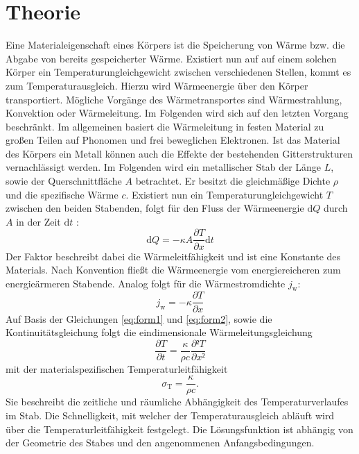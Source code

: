 
\section{Theorie}
\label{sec:Theorie}
Eine Materialeigenschaft eines Körpers ist die Speicherung von Wärme bzw. die Abgabe
 von bereits gespeicherter Wärme. Existiert nun auf auf einem solchen Körper
 ein Temperaturungleichgewicht zwischen verschiedenen Stellen, kommt es zum Temperaturausgleich.
 Hierzu wird Wärmeenergie über den Körper transportiert.
Mögliche Vorgänge des Wärmetransportes sind Wärmestrahlung, Konvektion oder
  Wärmeleitung. Im Folgenden wird sich auf den letzten Vorgang beschränkt. Im
  allgemeinen basiert die Wärmeleitung in festen Material zu großen Teilen auf Phonomen und
   frei beweglichen Elektronen. Ist das Material des Körpers ein Metall können auch die Effekte der
    bestehenden Gitterstrukturen vernachlässigt werden. Im Folgenden wird ein metallischer Stab der
    Länge $L$, sowie der Querschnittfläche $A$ betrachtet. Er besitzt die
    gleichmäßige Dichte $\rho$ und die spezifische Wärme $c$. Existiert nun ein
    Temperaturungleichgewicht $T$ zwischen den beiden Stabenden, folgt für den Fluss
     der Wärmeenergie $\text{d}Q$ durch $A$ in der Zeit $\text{d}t$ :
     \begin{equation}
       \text{d}Q = -\kappa A \frac{\partial T}{\partial x} \text{d}t \label{eq:form1}
       \end{equation}
       Der Faktor \kappa beschreibt dabei die Wärmeleitfähigkeit und ist eine
        Konstante des Materials. Nach Konvention fließt die Wärmeenergie vom
         energiereicheren zum energieärmeren Stabende. Analog folgt für die Wärmestromdichte $j_\text{w}$:
         \begin{equation}
           j_\text{w} = -\kappa \frac{\partial T}{\partial x} \label{eq:form2}
           \end{equation}
           Auf Basis der Gleichungen \ref{eq:form1} und \ref{eq:form2}, sowie die Kontinuitätsgleichung folgt
            die eindimensionale Wärmeleitungsgleichung
            \begin{equation}
              \frac{\partial T}{\partial t} = \frac{\kappa}{\rho c}\frac{\partial² T}{\partial x²}\label{eq:form3}
              \end{equation}
              mit der materialspezifischen Temperaturleitfähigkeit
              \begin{equation}
                \sigma_\text{T} = \frac{\kappa}{\rho c}\text{.}\label{eq:form4}
                \end{equation}
             Sie beschreibt
             die zeitliche und räumliche Abhängigkeit des Temperaturverlaufes im Stab.
             Die Schnelligkeit, mit welcher der Temperaturausgleich abläuft wird
             über die Temperaturleitfähigkeit festgelegt. Die Lösungsfunktion ist abhängig
             von der Geometrie des Stabes und den angenommenen Anfangsbedingungen.

